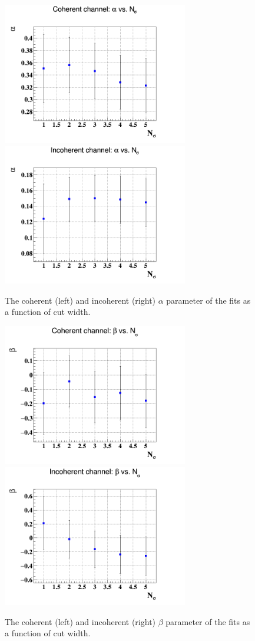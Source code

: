 \begin{figure}[h!]
   \includegraphics[height=6.2cm]{fig/coh_alpha_Nsig.png}
   \includegraphics[height=6.2cm]{fig/incoh_alpha_Nsig.png}
   \caption{The coherent (left) and incoherent (right) $\alpha$ parameter of 
the fits as a function of cut width.  }
\label{fig:sys_fit_alpha}
\end{figure}

\begin{figure}[h!]
   \includegraphics[height=6.2cm]{fig/coh_beta_Nsig.png}
   \includegraphics[height=6.2cm]{fig/incoh_beta_Nsig.png}
   \caption{The coherent (left) and incoherent (right) $\beta$ parameter of the 
fits as a function of cut width.  }
\label{fig:sys_fit_beta}
\end{figure}

